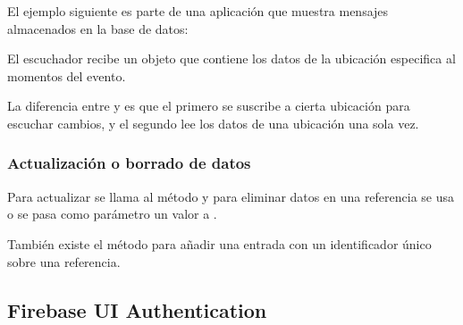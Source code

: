 El ejemplo siguiente es parte de una aplicación que muestra mensajes
almacenados en la base de datos:

%
\begin{sphinxVerbatim}[commandchars=\\\{\}]
 
      
       
\end{sphinxVerbatim}

El escuchador recibe un objeto  que contiene los datos de la
ubicación especifica al momentos del evento.

La diferencia entre  y
 es que el primero se suscribe a cierta
ubicación para escuchar cambios, y el segundo lee los datos de una ubicación
una sola vez.


\subsubsection{Actualización o borrado de datos}
\label{\detokenize{dev_docs:actulizacion-o-borrado-de-datos}}
Para actualizar se llama al método  y para eliminar datos
en una referencia se usa  o se pasa como parámetro un valor
 a .

También existe el método  para añadir una entrada con un identificador
único sobre una referencia.


\subsection*{Firebase UI Authentication}
\label{\detokenize{dev_docs:firebase-ui-authentication}}

